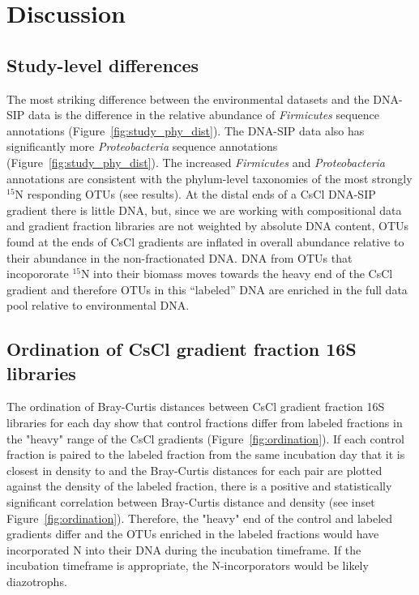 \section{Discussion}
\subsection{Study-level differences}
The most striking difference between the environmental datasets
\citep{Garcia_Pichel_2013, Steven_2013} and the DNA-SIP data is the difference
in the relative abundance of \textit{Firmicutes} sequence annotations
(Figure~\ref{fig:study_phy_dist}). The DNA-SIP data also has significantly more
\textit{Proteobacteria} sequence annotations (Figure~\ref{fig:study_phy_dist}).
The increased \textit{Firmicutes} and \textit{Proteobacteria} annotations are
consistent with the phylum-level taxonomies of the most strongly $^{15}$N
responding OTUs (see results). At the distal ends of a CsCl DNA-SIP gradient
there is little DNA, but, since we are working with compositional data and
gradient fraction libraries are not weighted by absolute DNA content, OTUs
found at the ends of CsCl gradients are inflated in overall abundance relative
to their abundance in the non-fractionated DNA. DNA from OTUs that incopororate
$^{15}$N into their biomass moves towards the heavy end of the CsCl gradient
and therefore OTUs in this ``labeled'' DNA are enriched in the full data pool
relative to environmental DNA. 

\subsection{Ordination of CsCl gradient fraction 16S libraries}
The ordination of Bray-Curtis distances between CsCl gradient fraction 16S
libraries for each day show that control fractions differ from labeled
fractions in the "heavy" range of the CsCl gradients
(Figure~\ref{fig:ordination}). If each control fraction is paired to the
labeled fraction from the same incubation day that it is closest in density to
and the Bray-Curtis distances for each pair are plotted against the density of
the labeled fraction, there is a positive and statistically significant
correlation between Bray-Curtis distance and density (see inset
Figure~\ref{fig:ordination}).  Therefore, the "heavy" end of the control and
labeled gradients differ and the
OTUs enriched in the labeled fractions would have incorporated N into their DNA
during the incubation timeframe. If the incubation timeframe is appropriate,
the N-incorporators would be likely diazotrophs.     

